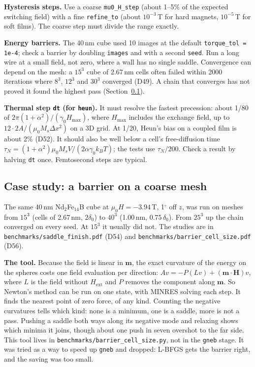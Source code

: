 \documentclass[10pt,a4paper]{article}
\newcommand{\code}[1]{\texttt{#1}}
\newcommand{\mo}{\mu_0}
\newcommand{\vm}{\mathbf{m}}
\newcommand{\vH}{\mathbf{H}}
\newcommand{\dec}[1]{\textcolor{comment}{\small(#1)}}
\begin{document}
\textbf{Hysteresis steps.} Use a coarse \code{mu0\_H\_step} (about 1--5\% of the expected switching field) with a fine
\code{refine\_to} (about $10^{-3}$\,T for hard magnets, $10^{-5}$\,T for soft films). The coarse step must divide the
range exactly.

\textbf{Energy barriers.} The 40\,nm cube used 10 images at the default \code{torque\_tol = 1e-4}; check a barrier by doubling
\code{images} and with a second \code{seed}. Run a long wire at a small field, not zero, where a wall has no single
saddle. Convergence can depend on the mesh: a $15^3$ cube of 2.67\,nm cells often failed within 2000 iterations where $8^3$, $12^3$ and
$30^3$ converged \dec{D49}. A chain that converges has not proved it found the highest pass (Section~\ref{sec:coarse}).

\textbf{Thermal step \code{dt} (for \code{heun}).} It must resolve the fastest precession: about 1/80 of
$2\pi(1+\alpha^2)/(\gamma_0 H_\mathrm{max})$, where $H_\mathrm{max}$ includes the exchange field, up to
$12\cdot 2A/(\mo M_s\Delta x^2)$ on a 3D grid. At 1/20, Heun's bias on a coupled film is about 2\% \dec{D52}. It should also be well below a cell's free-diffusion time
$\tau_N = (1+\alpha^2)\mo M_s V/(2\alpha\gamma_0 k_BT)$; the tests use $\tau_N/200$. Check a result by halving
\code{dt} once. Femtosecond steps are typical.

\subsection{Case study: a barrier on a coarse mesh}
\label{sec:coarse}
The same 40\,nm Nd$_2$Fe$_{14}$B cube at $\mo H = -3.94$\,T, 1$^\circ$ off $z$, was run on meshes from $15^3$ (cells of 2.67\,nm, $2\delta_0$) to $40^3$ (1.00\,nm, $0.75\,\delta_0$). From $25^3$ up the chain converged on
every seed. At $15^3$ it usually did not. The studies are in \code{benchmarks/saddle\_finish.pdf} \dec{D54} and
\code{benchmarks/barrier\_cell\_size.pdf} \dec{D56}.

\textbf{The tool.} Because the field is linear in $\vm$, the exact curvature of the energy on the spheres costs one field
evaluation per direction: $A v = -P(L v) + (\vm\cdot\vH)v$, where $L$ is the field without $H_\mathrm{ext}$ and $P$ removes the
component along $\vm$. So Newton's method can be run on one state, with MINRES solving each step. It finds the nearest point of zero
force, of any kind. Counting the negative curvatures tells which kind: none is a minimum, one is a saddle, more is not a
pass. Pushing a saddle both ways along its negative mode and relaxing shows which minima it joins, though about one push in seven
overshot to the far side. This tool lives in \code{benchmarks/barrier\_cell\_size.py}, not in the \code{gneb} stage. It was tried as
a way to speed up \code{gneb} and dropped: L-BFGS gets the barrier right, and the saving was too small.
\end{document}
